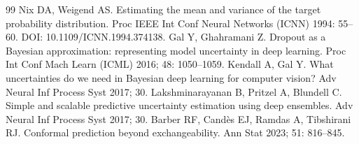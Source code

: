 \documentclass[11pt,a4paper]{article}
\begin{document}
\begin{thebibliography}{99}
 Nix DA, Weigend AS. Estimating the mean and variance of the target probability distribution. Proc IEEE Int Conf Neural Networks (ICNN) 1994: 55--60. DOI: 10.1109/ICNN.1994.374138.
 Gal Y, Ghahramani Z. Dropout as a Bayesian approximation: representing model uncertainty in deep learning. Proc Int Conf Mach Learn (ICML) 2016; 48: 1050--1059.
 Kendall A, Gal Y. What uncertainties do we need in Bayesian deep learning for computer vision? Adv Neural Inf Process Syst 2017; 30.
 Lakshminarayanan B, Pritzel A, Blundell C. Simple and scalable predictive uncertainty estimation using deep ensembles. Adv Neural Inf Process Syst 2017; 30.
 Barber RF, Cand\`es EJ, Ramdas A, Tibshirani RJ. Conformal prediction beyond exchangeability. Ann Stat 2023; 51: 816--845.
\end{thebibliography}
\end{document}
